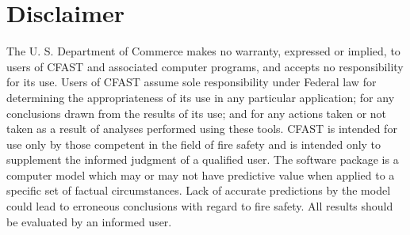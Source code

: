 \documentclass[12pt]{book}
\begin{document}
\begin{minipage}[t][9in][s]{6.5in}






\vfill


\titlesigs

\end{minipage}


\newpage

\frontmatter

\pagestyle{plain}
\setcounter{page}{3}


\chapter{Disclaimer}

The U. S. Department of Commerce makes no warranty, expressed or implied, to users of
CFAST and associated computer programs, and accepts no responsibility for its use.  Users of
CFAST assume sole responsibility under Federal law for determining the appropriateness of its
use in any particular application; for any conclusions drawn from the results of its use; and for
any actions taken or not taken as a result of analyses performed using these tools.
CFAST is intended for use only by those competent in the field of fire safety and is intended
only to supplement the informed judgment of a qualified user. The software package is a
computer model which may or may not have predictive value when applied to a specific set of
factual circumstances. Lack of accurate predictions by the model could lead to erroneous
conclusions with regard to fire safety. All results should be evaluated by an informed user.
\end{document}
